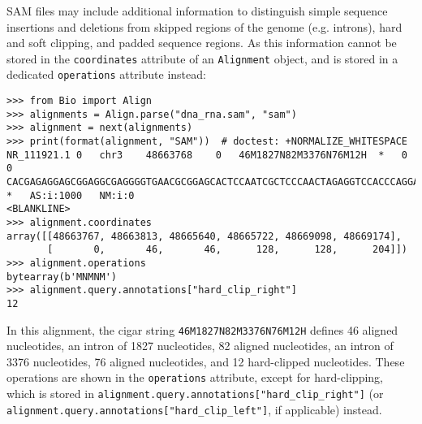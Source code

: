 SAM files may include additional information to distinguish simple sequence insertions and deletions from skipped regions of the genome (e.g. introns), hard and soft clipping, and padded sequence regions. As this information cannot be stored in the \verb|coordinates| attribute of an \verb|Alignment| object, and is stored in a dedicated \verb|operations| attribute instead:
\begin{verbatim}
>>> from Bio import Align
>>> alignments = Align.parse("dna_rna.sam", "sam")
>>> alignment = next(alignments)
>>> print(format(alignment, "SAM"))  # doctest: +NORMALIZE_WHITESPACE
NR_111921.1	0	chr3	48663768	0	46M1827N82M3376N76M12H	*	0	0	CACGAGAGGAGCGGAGGCGAGGGGTGAACGCGGAGCACTCCAATCGCTCCCAACTAGAGGTCCACCCAGGACCCAGAGACCTGGATTTGAGGCTGCTGGGCGGCAGATGGAGCGATCAGAAGACCAGGAGACGGGAGCTGGAGTGCAGTGGCTGTTCACAAGCGTGAAAGCAAAGATTAAAAAATTTGTTTTTATATTAAAAAA	*	AS:i:1000	NM:i:0
<BLANKLINE>
>>> alignment.coordinates
array([[48663767, 48663813, 48665640, 48665722, 48669098, 48669174],
       [       0,       46,       46,      128,      128,      204]])
>>> alignment.operations
bytearray(b'MNMNM')
>>> alignment.query.annotations["hard_clip_right"]
12
\end{verbatim}
In this alignment, the cigar string \verb|46M1827N82M3376N76M12H| defines 46 aligned nucleotides, an intron of 1827 nucleotides, 82 aligned nucleotides, an intron of 3376 nucleotides, 76 aligned nucleotides, and 12 hard-clipped nucleotides. These operations are shown in the \verb|operations| attribute, except for hard-clipping, which is stored in \verb|alignment.query.annotations["hard_clip_right"]| (or \verb|alignment.query.annotations["hard_clip_left"]|, if applicable) instead.

